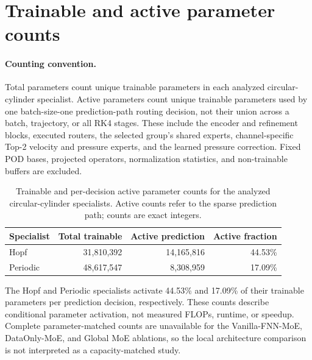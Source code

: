\documentclass{article}
\begin{document}
\par

\clearpage
\section{Trainable and active parameter counts}
\label{app:parameter_counts}

\paragraph{Counting convention.}
Total parameters count unique trainable parameters in each analyzed
circular-cylinder specialist. Active parameters count unique trainable
parameters used by one batch-size-one prediction-path routing decision,
not their union across a batch, trajectory, or all RK4 stages. These include
the encoder and refinement blocks, executed routers, the selected group's
shared experts, channel-specific Top-2 velocity and pressure experts, and
the learned pressure correction. Fixed POD bases, projected operators,
normalization statistics, and non-trainable buffers are excluded.

\par


\begin{table}[H]
\centering
\caption{Trainable and per-decision active parameter counts for the analyzed
circular-cylinder specialists. Active counts refer to the sparse prediction
path; counts are exact integers.}
\label{tab:parameter_counts}
\begin{tabular}{lrrr}
\toprule
Specialist & Total trainable & Active prediction & Active fraction \\
\midrule
Hopf & 31,810,392 & 14,165,816 & 44.53\% \\
Periodic & 48,617,547 & 8,308,959 & 17.09\% \\
\bottomrule
\end{tabular}
\end{table}


\par

The Hopf and Periodic specialists activate 44.53\% and 17.09\% of their
trainable parameters per prediction decision, respectively. These counts
describe conditional parameter activation, not measured FLOPs, runtime,
or speedup. Complete parameter-matched counts are unavailable for the
Vanilla-FNN-MoE, DataOnly-MoE, and Global MoE ablations, so the local
architecture comparison is not interpreted as a capacity-matched study.
\end{document}
